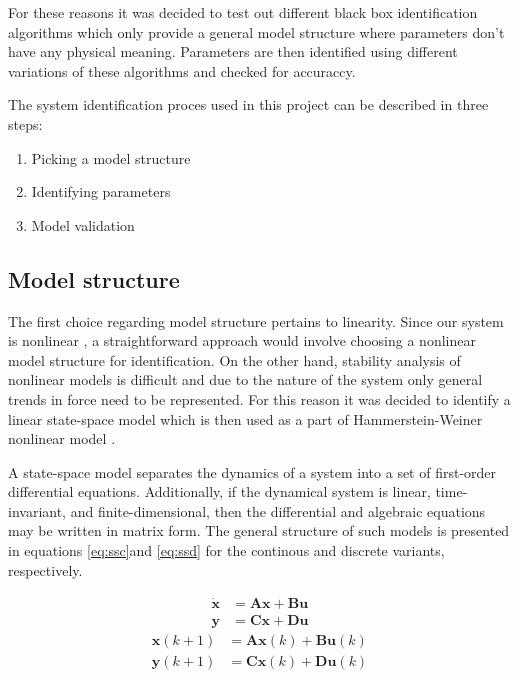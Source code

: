 For these reasons it was decided to test out different black box identification algorithms which only provide a general model structure where parameters don't have any physical meaning. Parameters are then identified using different variations of these algorithms and checked for accuraccy.

The system identification proces used in this project can be described in three steps:
\begin{enumerate}
\item Picking a model structure
\item Identifying parameters
\item Model validation
\end{enumerate}

\subsection{Model structure}\label{se:ms}
The first choice regarding model structure pertains to linearity.
Since our system is nonlinear , a straightforward approach would involve choosing a nonlinear model structure for identification.
On the other hand, stability analysis of nonlinear models is difficult and due to the nature of the system only general trends in force need to be represented.
For this reason it was decided to identify a linear state-space model which is then used as a part of Hammerstein-Weiner nonlinear model \cite{zhu2002estimation}.

A state-space model separates the dynamics of a system into a set of first-order differential equations.
Additionally, if the dynamical system is linear, time-invariant, and finite-dimensional, then the differential and algebraic equations may be written in matrix form. The general structure of such models is presented in equations \ref{eq:ssc}and \ref{eq:ssd} for the continous and discrete variants, respectively.

\begin{align}\label{eq:ssc}
\dot{\mathbf{x}} &= \mathbf{A}\mathbf{x} + \mathbf{B}\mathbf{u} \\
\mathbf{y} &= \mathbf{C}\mathbf{x} + \mathbf{D}\mathbf{u}
\end{align}
\vspace{-0.5cm}
\begin{align}\label{eq:ssd}
\mathbf{x}(k+1) &= \mathbf{A}\mathbf{x}(k) + \mathbf{B}\mathbf{u}(k)\\
\mathbf{y}(k+1) &= \mathbf{C}\mathbf{x}(k) + \mathbf{D}\mathbf{u}(k)
\end{align}

